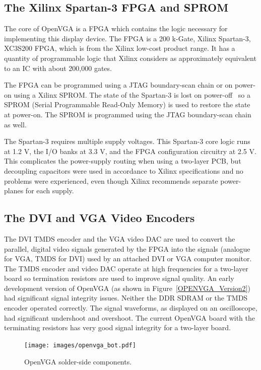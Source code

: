 \subsection{The Xilinx Spartan-3 FPGA and SPROM}
The core of OpenVGA is a FPGA which contains the logic necessary for implementing
this display device. The FPGA is a 200 k-Gate, Xilinx Spartan-3, XC3S200 FPGA,
which is from the Xilinx low-cost product range. It has a quantity of
programmable logic that Xilinx considers as approximately equivalent to an IC
with about 200,000 gates.

The FPGA can be programmed using a JTAG boundary-scan chain or on power-on using a Xilinx SPROM. The
state of the Spartan-3 is lost on power-off~\cite{Xilinx_SP3_DS} so a SPROM
(Serial Programmable Read-Only Memory) is used to restore the state at power-on.
The SPROM is programmed using the JTAG boundary-scan chain as well.

The Spartan-3 requires multiple supply voltages. This Spartan-3 core logic runs
at 1.2 V, the I/O banks at 3.3 V, and the FPGA configuration circuitry at 2.5 V.
This complicates the power-supply routing when using a two-layer PCB, but
decoupling capacitors were used in accordance to Xilinx specifications and no
problems were experienced, even though Xilinx recommends separate power-planes
for each supply.


\subsection{The DVI and VGA Video Encoders}
The DVI TMDS encoder and the VGA video DAC are used to convert the parallel,
digital video signals generated by the FPGA into the signals (analogue for VGA,
TMDS for DVI) used by an attached DVI or VGA computer monitor. The TMDS encoder
and video DAC operate at high frequencies for a two-layer board so termination
resistors are used to improve signal quality. An early development version of
OpenVGA (as shown in Figure~\ref{OPENVGA_Version2}) had significant signal
integrity issues. Neither the DDR SDRAM or the TMDS encoder operated correctly.
The signal waveforms, as displayed on an oscilloscope, had significant undershoot
and overshoot. The current OpenVGA board with the terminating resistors has very
good signal integrity for a two-layer board.

\begin{figure}[h!]
\begin{center}
\texttt{[image: images/openvga\_bot.pdf]}
\end{center}
\caption[OpenVGA solder-side components]{OpenVGA solder-side components.}
\label{HARD_Bot}
\end{figure}


